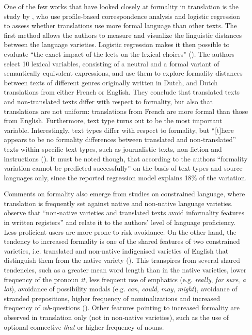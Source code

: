\documentclass[output=paper]{langscibook}
\begin{document}
One of the few works that have looked closely at formality in translation is the study by \citet[343]{DeSutterEtAl2012}, who use profile-based correspondence analysis and logistic regression to assess whether translations use more formal language than other texts. The first method allows the authors to measure and visualize the linguistic distances between the language varieties. Logistic regression makes it then possible to evaluate “the exact impact of the lects on the lexical choices” (\citealt[325]{DeSutterEtAl2012}). The authors select 10 lexical variables, consisting of a neutral and a formal variant of semantically equivalent expressions, and use them to explore formality distances between texts of different genres originally written in Dutch, and Dutch translations from either French or English. They conclude that translated texts and non-translated texts differ with respect to formality, but also that translations are not uniform: translations from French are more formal than those from English. Furthermore, text type turns out to be the most important variable. Interestingly, text types differ with respect to formality, but “[t]here appears to be no formality differences between translated and non-translated” texts within specific text types, such as journalistic texts, non-fiction and instructions (\citealt[340]{DeSutterEtAl2012}). It must be noted though, that according to the authors “formality variation cannot be predicted successfully” on the basis of text types and source languages only, since the reported regression model explains 18\% of the variation.

Comments on formality also emerge from studies on constrained language, where translation is frequently set against native and non-native language varieties. \citet[237]{KrugervanRooy2018} observe that “non-native varieties and translated texts avoid informality features in written registers” and relate it to the authors’ level of language proficiency. Less proficient users are more prone to risk avoidance. On the other hand, the tendency to increased formality is one of the shared features of two constrained varieties, i.e. translated and non-native indigenised varieties of English that distinguish them from the native variety (\citealt[26]{KrugervanRooy2016constrained}). This transpires from several shared tendencies, such as a greater mean word length than in the native varieties, lower frequency of the pronoun \textit{it}, less frequent use of emphatics (e.g. \textit{really}, \textit{for sure}, \textit{a lot}), avoidance of possibility modals (e.g. \textit{can}, \textit{could}, \textit{may}, \textit{might}), avoidance of stranded prepositions, higher frequency of nominalizations and increased frequency of \textit{wh}{}-questions (\citealt[37--41]{KrugervanRooy2016constrained}). Other features pointing to increased formality are observed in translation only (not in non-native varieties), such as the use of optional connective \textit{that} or higher frequency of nouns.
\end{document}
